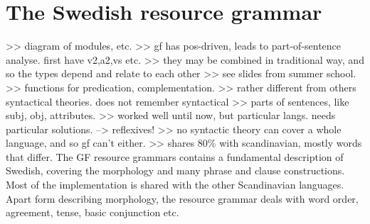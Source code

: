 \documentclass{report}
\begin{document}
\section{The Swedish resource grammar}
\label{sec:swegf}
>> diagram of modules, etc.
>> gf has pos-driven, leads to part-of-sentence analyse. first have v2,a2,vs etc.
>> they may be combined in traditional way, and so the types depend and relate to each other
>> see slides from summer school.
>> functions for predication, complementation.
>> rather different from others syntactical theories. does not remember syntactical
>> parts of sentences, like subj, obj, attributes.
>> worked well until now, but particular langs. needs particular solutions. --> reflexives!
>> no syntactic theory can cover a whole language, and so gf can't either.
>> shares 80\% with scandinavian, mostly words that differ.
The GF resource grammars contains a fundamental description of Swedish,
covering the morphology and many phrase and clause constructions. Most of the implementation
is shared with the other Scandinavian languages.
Apart form describing morphology, the resource grammar deals with
word order, agreement, tense, basic conjunction etc.
\end{document}

